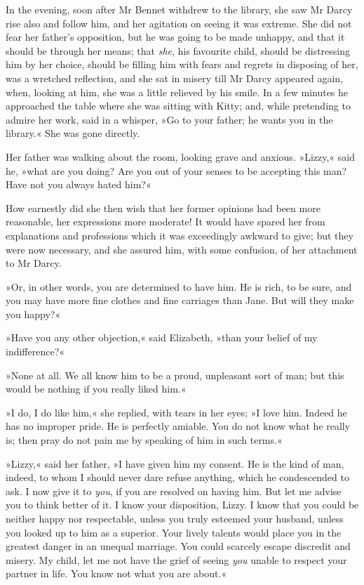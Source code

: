 In the evening, soon after Mr Bennet withdrew to the library, she saw Mr Darcy rise also and follow him, and her agitation on seeing it was extreme. She did not fear her father's opposition, but he was going to be made unhappy, and that it should be through her means; that \textit{she}, his favourite child, should be distressing him by her choice, should be filling him with fears and regrets in disposing of her, was a wretched reflection, and she sat in misery till Mr Darcy appeared again, when, looking at him, she was a little relieved by his smile. In a few minutes he approached the table where she was sitting with Kitty; and, while pretending to admire her work, said in a whisper, »Go to your father; he wants you in the library.« She was gone directly.

Her father was walking about the room, looking grave and anxious. »Lizzy,« said he, »what are you doing? Are you out of your senses to be accepting this man? Have not you always hated him?«

How earnestly did she then wish that her former opinions had been more reasonable, her expressions more moderate! It would have spared her from explanations and professions which it was exceedingly awkward to give; but they were now necessary, and she assured him, with some confusion, of her attachment to Mr Darcy.

»Or, in other words, you are determined to have him. He is rich, to be sure, and you may have more fine clothes and fine carriages than Jane. But will they make you happy?«

»Have you any other objection,« said Elizabeth, »than your belief of my indifference?«

»None at all. We all know him to be a proud, unpleasant sort of man; but this would be nothing if you really liked him.«

»I do, I do like him,« she replied, with tears in her eyes; »I love him. Indeed he has no improper pride. He is perfectly amiable. You do not know what he really is; then pray do not pain me by speaking of him in such terms.«

»Lizzy,« said her father, »I have given him my consent. He is the kind of man, indeed, to whom I should never dare refuse anything, which he condescended to ask. I now give it to \textit{you}, if you are resolved on having him. But let me advise you to think better of it. I know your disposition, Lizzy. I know that you could be neither happy nor respectable, unless you truly esteemed your husband, unless you looked up to him as a superior. Your lively talents would place you in the greatest danger in an unequal marriage. You could scarcely escape discredit and misery. My child, let me not have the grief of seeing \textit{you} unable to respect your partner in life. You know not what you are about.«

